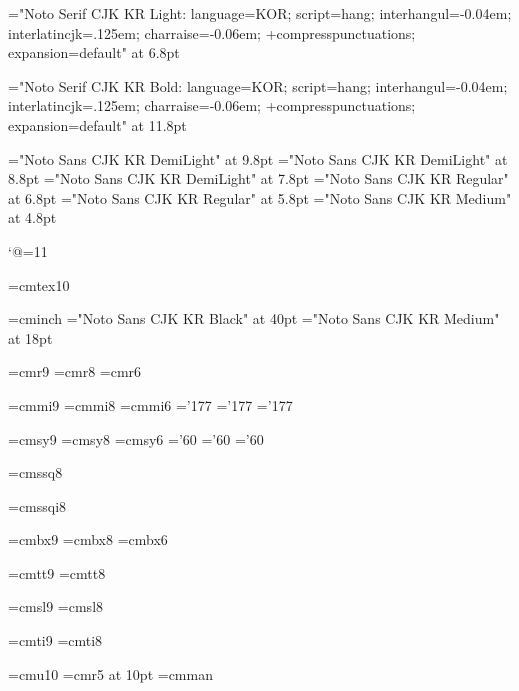 \sethangulfont\sevenmj="Noto Serif CJK KR Light:%
  language=KOR;%
  script=hang;%
  interhangul=-0.04em;%
  interlatincjk=.125em;%
  charraise=-0.06em;%
  +compresspunctuations;%
  expansion=default" at 6.8pt

\sethangulfont\twelvemj="Noto Serif CJK KR Bold:%
  language=KOR;%
  script=hang;%
  interhangul=-0.04em;%
  interlatincjk=.125em;%
  charraise=-0.06em;%
  +compresspunctuations;%
  expansion=default" at 11.8pt

\font\texthangul="Noto Sans CJK KR DemiLight" at 9.8pt
\font\texthangulnine="Noto Sans CJK KR DemiLight" at 8.8pt
\font\texthanguleight="Noto Sans CJK KR DemiLight" at 7.8pt
\font\scripthangul="Noto Sans CJK KR Regular" at 6.8pt
\font\scripthangulsix="Noto Sans CJK KR Regular" at 5.8pt
\font\scriptscripthangul="Noto Sans CJK KR Medium" at 4.8pt

%
\catcode`@=11 %

\font\tentex=cmtex10

\font\inchhigh=cminch
\font\titlefont="Noto Sans CJK KR Black" at 40pt
\font\sectionfont="Noto Sans CJK KR Medium" at 18pt

\font\ninerm=cmr9
\let\mc=\ninerm %
\font\eightrm=cmr8
\font\sixrm=cmr6

\font\ninei=cmmi9
\font\eighti=cmmi8
\font\sixi=cmmi6
\skewchar\ninei='177 \skewchar\eighti='177 \skewchar\sixi='177

\font\ninesy=cmsy9
\font\eightsy=cmsy8
\font\sixsy=cmsy6
\skewchar\ninesy='60 \skewchar\eightsy='60 \skewchar\sixsy='60

\font\eightss=cmssq8

\font\eightssi=cmssqi8

\font\ninebf=cmbx9
\font\eightbf=cmbx8
\font\sixbf=cmbx6

\font\ninett=cmtt9
\font\eighttt=cmtt8

\hyphenchar{} %
\hyphenchar{}
\hyphenchar{}

\font\ninesl=cmsl9
\font\eightsl=cmsl8

\font\nineit=cmti9
\font\eightit=cmti8

\font\tenu=cmu10 %
\font\magnifiedfiverm=cmr5 at 10pt
\font\cmman=cmman %

